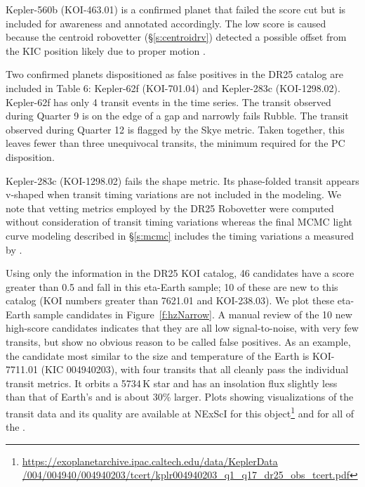 Kepler-560b (KOI-463.01) is a confirmed planet that failed the score cut but is included for awareness and annotated accordingly.  The low score is caused because the centroid robovetter (\S\ref{s:centroidrv}) detected a possible offset from the KIC position likely due to proper motion \citep{Mann2017}.  

Two confirmed planets dispositioned as false positives in the DR25 catalog are included in Table 6: Kepler-62f (KOI-701.04) and Kepler-283c (KOI-1298.02).  Kepler-62f has only 4 transit events in the time series.  The transit observed during Quarter 9 is on the edge of a gap and narrowly fails Rubble.  The transit observed during Quarter 12 is flagged by the Skye metric.  Taken together, this leaves fewer than three unequivocal transits, the minimum required for the PC disposition. 

Kepler-283c (KOI-1298.02) fails the shape metric.  Its phase-folded transit appears v-shaped when transit timing variations are not included in the modeling.  We note that vetting metrics employed by the DR25 Robovetter were computed without consideration of transit timing variations whereas the final MCMC light curve modeling described in \S\ref{s:mcmc} includes the timing variations a measured by \cite{Rowe2015cat}. 

Using only the information in the DR25 KOI catalog,  46 candidates have a score greater than 0.5 and fall in this eta-Earth sample; 10 of these are new to this catalog (KOI numbers greater than 7621.01 and KOI-238.03).  We plot these eta-Earth sample candidates in Figure~\ref{f:hzNarrow}.  A manual review of the 10 new high-score candidates indicates that they are all low signal-to-noise, with very few transits, but show no obvious reason to be called false positives. As an example, the candidate most similar to the size and temperature of the Earth is KOI-7711.01 (KIC 004940203), with four transits that all cleanly pass the individual transit metrics. It orbits a 5734\,K star and has an insolation flux slightly less than that of Earth's and is about 30\% larger.  Plots showing visualizations of the transit data and its quality are available at NExScI for this object\footnote{\url{https://exoplanetarchive.ipac.caltech.edu/data/KeplerData /004/004940/004940203/tcert/kplr004940203\_q1\_q17\_dr25\_obs\_tcert.pdf}} and for all of the .


